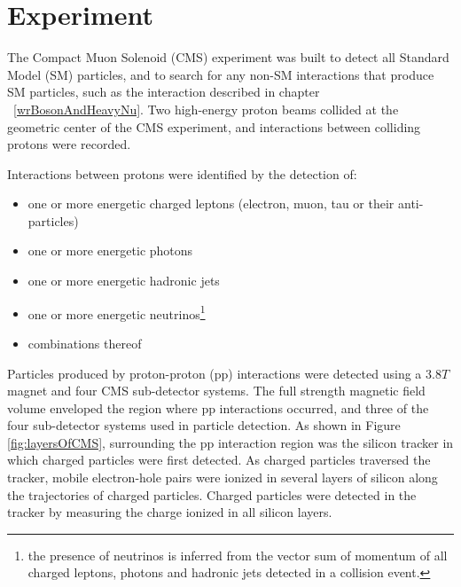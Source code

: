 \chapter{Experiment}
\label{experiment_chapter}
The Compact Muon Solenoid (CMS) experiment was built to detect all Standard Model (SM) particles, and to
search for any non-SM interactions that produce SM particles, such as the interaction described in 
chapter ~\ref{wrBosonAndHeavyNu}.  Two high-energy proton beams collided at the geometric center of
the CMS experiment, and interactions between colliding protons were recorded.

Interactions between protons were identified by the detection of:
\begin{itemize}
	\item one or more energetic charged leptons (electron, muon, tau or their anti-particles)
	\item one or more energetic photons
	\item one or more energetic hadronic jets
	\item one or more energetic neutrinos\footnote{the presence of neutrinos is inferred from the vector sum of momentum of all charged leptons, photons and hadronic jets detected in a collision event.}
	\item combinations thereof
\end{itemize}
Particles produced by proton-proton (pp) interactions were detected using a 3.8$\unit{T}$ magnet and four CMS 
sub-detector systems.  The full strength magnetic field volume enveloped the region where pp interactions occurred, and three of the four 
sub-detector systems used in particle detection.  As shown in Figure \ref{fig:layersOfCMS}, surrounding the pp interaction
region was the silicon tracker in which charged particles were first detected.  As charged particles traversed
the tracker, mobile electron-hole pairs were ionized in several layers of silicon along the trajectories of charged
particles.  Charged particles were detected in the tracker by measuring the charge ionized in all silicon layers.

